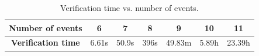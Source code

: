 \begin{table}[tb]
\scriptsize
\ssp
\caption{Verification time vs. number of events.}
\centering
\label{verificationtime}
{
\begin{tabular}{| c | c | c | c | c | c | c |}
\hline
\bf Number of events & 6 & 7 & 8 & 9 & 10 & 11\\
\hline
\bf Verification time & 6.61s & 50.9s & 396s & 49.83m & 5.89h & 23.39h\\
\hline
\end{tabular}
}
\end{table}

